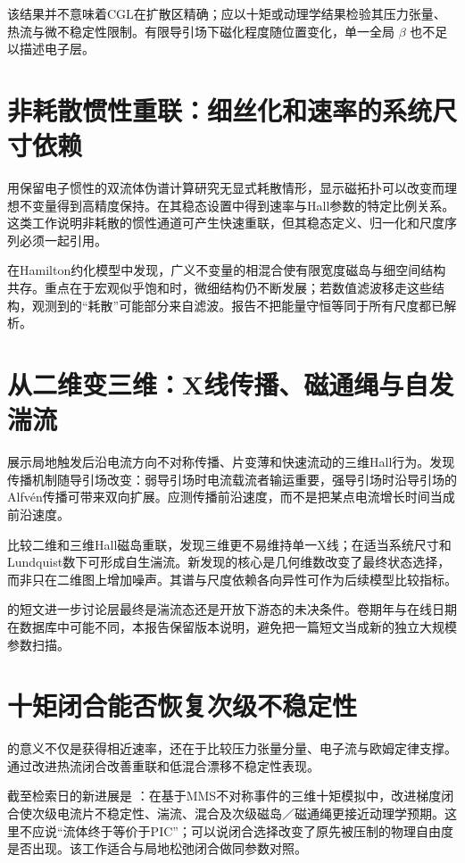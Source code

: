 该结果并不意味着CGL在扩散区精确；应以十矩或动理学结果检验其压力张量、热流与微不稳定性限制。有限导引场下磁化程度随位置变化，单一全局 $\beta$ 也不足以描述电子层。

\section{非耗散惯性重联：细丝化和速率的系统尺寸依赖}
\citet{Andres2014}用保留电子惯性的双流体伪谱计算研究无显式耗散情形，显示磁拓扑可以改变而理想不变量得到高精度保持。\citet{Andres2016}在其稳态设置中得到速率与Hall参数的特定比例关系。这类工作说明非耗散的惯性通道可产生快速重联，但其稳态定义、归一化和尺度序列必须一起引用。

\citet{Grasso2001}在Hamilton约化模型中发现，广义不变量的相混合使有限宽度磁岛与细空间结构共存。重点在于宏观似乎饱和时，微细结构仍不断发展；若数值滤波移走这些结构，观测到的“耗散”可能部分来自滤波。报告不把能量守恒等同于所有尺度都已解析。

\section{从二维变三维：X线传播、磁通绳与自发湍流}
\citet{Huba2002}展示局地触发后沿电流方向不对称传播、片变薄和快速流动的三维Hall行为。\citet{Shepherd2012}发现传播机制随导引场改变：弱导引场时电流载流者输运重要，强导引场时沿导引场的Alfvén传播可带来双向扩展。应测传播前沿速度，而不是把某点电流增长时间当成前沿速度。

\citet{Huang2024}比较二维和三维Hall磁岛重联，发现三维更不易维持单一X线；在适当系统尺寸和Lundquist数下可形成自生湍流。新发现的核心是几何维数改变了最终状态选择，而非只在二维图上增加噪声。其谱与尺度依赖各向异性可作为后续模型比较指标。

\citet{Huang2026}的短文进一步讨论层最终是湍流态还是开放下游态的未决条件。卷期年与在线日期在数据库中可能不同，本报告保留版本说明，避免把一篇短文当成新的独立大规模参数扫描。

\section{十矩闭合能否恢复次级不稳定性}
\citet{Wang2015}的意义不仅是获得相近速率，还在于比较压力张量分量、电子流与欧姆定律支撑。\citet{Ng2020}通过改进热流闭合改善重联和低混合漂移不稳定性表现。

截至检索日的新进展是 \citet{Closure2026}：在基于MMS不对称事件的三维十矩模拟中，改进梯度闭合使次级电流片不稳定性、湍流、混合及次级磁岛／磁通绳更接近动理学预期。这里不应说“流体终于等价于PIC”；可以说闭合选择改变了原先被压制的物理自由度是否出现。该工作适合与局地松弛闭合做同参数对照。

